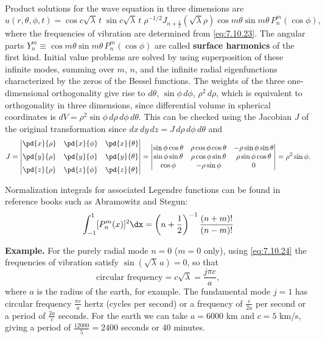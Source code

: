 Product solutions for the wave equation in three dimensions are
\[
u(r,\theta,\phi,t) = \cos c\sqrt{\lambda}\,t\;\sin c\sqrt{\lambda}\,t\;\rho^{-1/2}J_{n+\frac{1}{2}}(\sqrt{\lambda}\rho)\cos m\theta\sin m\theta\,P_n^m(\cos\phi),
\]
where the frequencies of vibration are determined from \eqref{eq:7.10.23}.  The angular parts $Y_n^m \equiv \cos m\theta\sin m\theta\,P_n^m(\cos\phi)$ are called \textbf{surface harmonics} of the first kind.  Initial value problems are solved by using superposition of these infinite modes, summing over $m$, $n$, and the infinite radial eigenfunctions characterized by the zeros of the Bessel functions.  The weights of the three one-dimensional orthogonality give rise to $d\theta$, $\sin\phi\,d\phi$, $\rho^2\,d\rho$, which is equivalent to orthogonality in three dimensions, since differential volume in spherical coordinates is $dV = \rho^2\sin\phi\,d\rho\,d\phi\,d\theta$.  This can be checked using the Jacobian $J$ of the original transformation since $dx\,dy\,dz = J\,d\rho\,d\phi\,d\theta$ and
\[
J = \begin{vmatrix}
\pd{x}{\rho} & \pd{x}{\phi} & \pd{x}{\theta} \\[6pt]
\pd{y}{\rho} & \pd{y}{\phi} & \pd{y}{\theta} \\[6pt]
\pd{z}{\rho} & \pd{z}{\phi} & \pd{z}{\theta}
\end{vmatrix}
= \begin{vmatrix}
\sin\phi\cos\theta & \rho\cos\phi\cos\theta & -\rho\sin\phi\sin\theta \\
\sin\phi\sin\theta & \rho\cos\phi\sin\theta & \rho\sin\phi\cos\theta \\
\cos\phi & -\rho\sin\phi & 0
\end{vmatrix}
= \rho^2\sin\phi.
\]

Normalization integrals for associated Legendre functions can be found in reference books such as Abramowitz and Stegun:
\begin{equation}
\int_{-1}^{1}[P_n^m(x)]^2\dx = \left(n + \frac{1}{2}\right)^{-1}\frac{(n+m)!}{(n-m)!}
\label{eq:7.10.25}
\end{equation}

\textbf{Example.}  For the purely radial mode $n = 0$ ($m = 0$ only), using \eqref{eq:7.10.24} the frequencies of vibration satisfy $\sin(\sqrt{\lambda}\,a) = 0$, so that
\[
\text{circular frequency} = c\sqrt{\lambda} = \frac{j\pi c}{a},
\]
where $a$ is the radius of the earth, for example.  The fundamental mode $j = 1$ has circular frequency $\frac{\pi c}{a}$ hertz (cycles per second) or a frequency of $\frac{c}{2a}$ per second or a period of $\frac{2a}{c}$ seconds.  For the earth we can take $a = 6000$ km and $c = 5$ km/s, giving a period of $\frac{12000}{5} = 2400$ seconds or 40 minutes.

